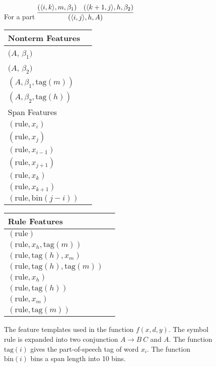 \documentclass[11pt,letterpaper]{article}
\newcommand{\Span}[1]{\langle #1 \rangle}
\newcommand{\RuleSym}{\mathrm{rule}}
\newcommand{\Rule}[3]{#1 \rightarrow #2\ #3}
\newcommand{\BinFN}[1]{\mathrm{bin}({#1})}
\newcommand{\TagFN}[1]{\mathrm{tag}({#1})}
\newcommand{\WordFN}[1]{x_{#1}}
\begin{document}
\begin{figure}
  \footnotesize
  \centering
  For a part $ \infer{(\Span{i, j}, h, A)}{(\Span{i, k}, m, \beta_1) &  (\Span{k+1, j}, h, \beta_2)} $

  \vspace{0.5cm}

  \begin{multicols}{2}

  \begin{tabular}{|l|l}

  \hline
  Nonterm Features \\
  \hline

  \hline
  $(A$, $\beta_1)$ \\
  $(A$, $\beta_2)$ \\
  $(A, \beta_1, \TagFN{m})$ \\
  $(A, \beta_2, \TagFN{h})$ \\
  \hline
    \hline
  Span Features \\
  \hline

  \hline
  $(\RuleSym, \WordFN{i})$\\
  $(\RuleSym, \WordFN{j})$\\
  $(\RuleSym, \WordFN{i-1})$\\
  $(\RuleSym, \WordFN{j+1})$\\
  $(\RuleSym, \WordFN{k})$\\
  $(\RuleSym, \WordFN{k+1})$\\
  $(\RuleSym, \BinFN{j-i})$\\
  \hline

  \end{tabular}

  \begin{tabular}{|l|l}

  \hline


  Rule Features \\
  \hline

  \hline

  $(\RuleSym  )$\\
  $(\RuleSym, \WordFN{h}, \TagFN{m})$ \\
  $(\RuleSym, \TagFN{h}, \WordFN{m})$ \\
  $(\RuleSym, \TagFN{h}, \TagFN{m})$ \\

  $(\RuleSym, \WordFN{h})$ \\
  $(\RuleSym, \TagFN{h})$ \\
  $(\RuleSym, \WordFN{m})$ \\
  $(\RuleSym, \TagFN{m})$ \\

  \hline

  \end{tabular}
  \end{multicols}
  \label{fig:features}
  \caption{The feature templates used in the function $f(x, d, y)$. The symbol $\RuleSym$ is expanded into two conjunction $\Rule{A}{B}{C}$ and $A$. The function $\TagFN{i}$ gives the part-of-speech tag of word $x_i$. The function $\BinFN{i}$ bins a span length into 10 bins.
  }
\end{figure}
\end{document}
